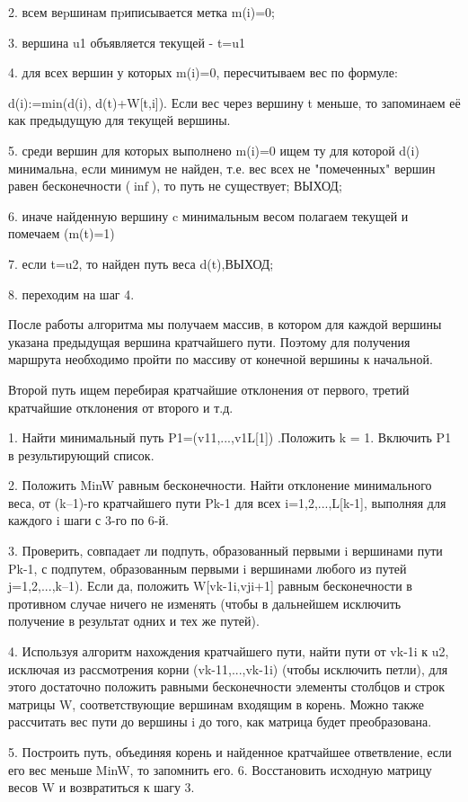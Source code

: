 2. всем веpшинам пpиписывается метка m(i)=0; 

3. вершина u1 объявляется текущей - t=u1 

4. для всех вершин у которых m(i)=0, пересчитываем вес по формуле: 

d(i):=min(d(i), d(t)+W[t,i]). Если вес через вершину t меньше, то запоминаем её как предыдущую для текущей вершины. 

5. среди вершин для которых выполнено m(i)=0 ищем ту для которой d(i) минимальна, если минимум не найден, т.е. вес всех не "помеченных" вершин равен бесконечности ($\inf$), то путь не существует; ВЫХОД; 

6. иначе найденную вершину c минимальным весом полагаем текущей и помечаем (m(t)=1) 

7. если t=u2, то найден путь веса d(t),ВЫХОД; 

8. переходим на шаг 4. 

После работы алгоритма мы получаем массив, в котором для каждой вершины указана предыдущая вершина кратчайшего пути. Поэтому для получения маршрута необходимо пройти по массиву от конечной вершины к начальной.

Второй путь ищем перебирая кратчайшие отклонения от первого, третий кратчайшие отклонения от второго и т.д. 

1. Найти минимальный путь P1=(v11,...,v1L[1]) .Положить k = 1. Включить P1 в результирующий список. 

2. Положить MinW равным бесконечности. Найти отклонение минимального веса, от (k–1)-го кратчайшего пути Pk-1 для всех i=1,2,...,L[k-1], выполняя для каждого i шаги с 3-го по 6-й. 

3. Проверить, совпадает ли подпуть, образованный первыми i вершинами пути Pk-1, с подпутем, образованным первыми i вершинами любого из путей j=1,2,...,k–1). Если да, положить W[vk-1i,vji+1] равным бесконечности в противном случае ничего не изменять (чтобы в дальнейшем исключить получение в результат одних и тех же путей). 

4. Используя алгоритм нахождения кратчайшего пути, найти пути от vk-1i к u2, исключая из рассмотрения корни (vk-11,...,vk-1i) (чтобы исключить петли), для этого достаточно положить равными бесконечности элементы столбцов и строк матрицы W, соответствующие вершинам входящим в корень. Можно также рассчитать вес пути до вершины i до того, как матрица будет преобразована.

5. Построить путь, объединяя корень и найденное кратчайшее ответвление, если его вес меньше MinW, то запомнить его. 6. Восстановить исходную матрицу весов W и возвратиться к шагу 3. 

